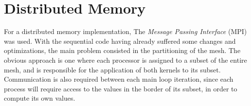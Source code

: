 \section{Distributed Memory}
\label{sec:mpi}

For a distributed memory implementation, The \textit{Message Passing Interface} (MPI) was used. With the sequential code having already suffered some changes and optimizations, the main problem consisted in the partitioning of the mesh. The obvious approach is one where each processor is assigned to a subset of the entire mesh, and is responsible for the application of both kernels to its subset. Communication is also required between each main loop iteration, since each process will require access to the values in the border of its subset, in order to compute its own values.




